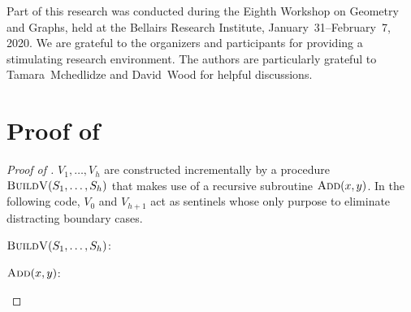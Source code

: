 \documentclass[kpfonts]{patmorin}
\let\ge\geqslant
\begin{document}
Part of this research was conducted during the Eighth Workshop on Geometry and Graphs, held at the Bellairs Research Institute, January~31--February~7, 2020.  We are grateful to the organizers and participants for providing a stimulating research environment.  The authors are particularly grateful to Tamara~Mchedlidze and David~Wood for helpful discussions.





\newpage
\appendix

\section{Proof of }


\begin{proof}[Proof of ]
  $V_1,\ldots,V_{h}$ are constructed incrementally by a procedure $\textsc{BuildV}(S_1,\ldots,S_h)$ that makes use of a recursive subroutine $\textsc{Add}(x, y)$.  In the following code, $V_0$ and $V_{h+1}$ act as sentinels whose only purpose to eliminate distracting boundary cases.

  \noindent$\textsc{BuildV}(S_1,\ldots,S_h)$:
  \begin{algorithmic}[1]
        \ENDIF
      \ENDFOR
    \ENDFOR
  \end{algorithmic}

  \noindent$\textsc{Add}(x, y)$:
  \begin{algorithmic}[1]
      \IF{$|V_y|\ge 4$}
        \ENDIF
      \ENDIF
    \ENDIF
  \end{algorithmic}


\end{proof}
\end{document}
